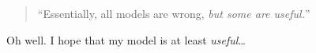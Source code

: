 
\begin{preamble}
    \thispagestyle{empty}
    \begin{quote}
        ``Essentially, all models are wrong, \emph{but some are useful.}''
    \end{quote}
    
    Oh well. I hope that my model is at least \emph{useful}\ldots
\end{preamble}
